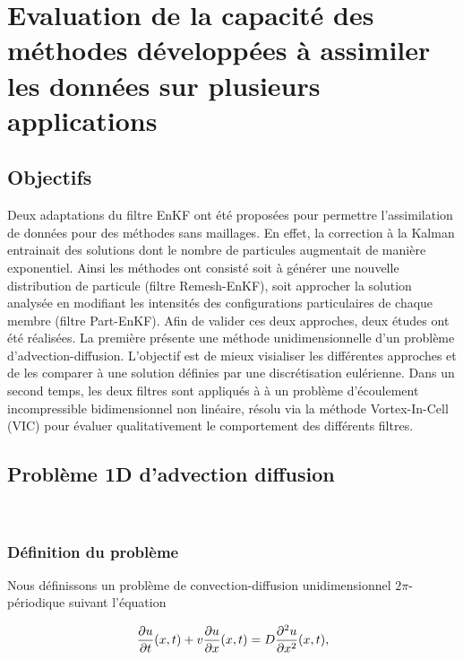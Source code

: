 \chapter{Evaluation de la capacité des méthodes développées à assimiler les données sur plusieurs applications}
\newcommand{\xx}{x_0 = 0.02}
\newcommand{\sigx}{\sigma_0^2 = 0.5}
\newcommand{\npart}{$N_{part} = 100$}
\newcommand{\ngrid}{$N_{grid} = 100$}
\newcommand{\sigmaY}{0.05}

\section{Objectifs}

Deux adaptations du filtre EnKF ont été proposées pour permettre l'assimilation de données pour des méthodes sans maillages. En effet, la correction à la Kalman entrainait des solutions dont le nombre de particules augmentait de manière exponentiel. Ainsi les méthodes ont consisté soit à générer une nouvelle distribution de particule (filtre Remesh-EnKF), soit approcher la solution analysée en modifiant les intensités des configurations particulaires de chaque membre (filtre Part-EnKF). Afin de valider ces deux approches, deux études ont été réalisées. La première présente une méthode unidimensionnelle d'un problème d'advection-diffusion. L'objectif est de mieux visialiser les différentes approches et de les comparer à une solution définies par une discrétisation eulérienne. Dans un second temps, les deux filtres sont appliqués à à un problème d'écoulement incompressible bidimensionnel non linéaire, résolu via la méthode Vortex-In-Cell (VIC) pour évaluer qualitativement le comportement des différents filtres.

\section{Problème 1D d'advection diffusion}~\label{sec:App_1D}

\subsection{Définition du problème}
Nous définissons un problème de convection-diffusion unidimensionnel $2\pi$-périodique suivant l'équation

\begin{equation*}
    \frac{\partial u}{\partial t}(x,t) + v \frac{\partial u}{\partial x}(x,t) = D \frac{\partial^2 u}{\partial x^2}(x,t),
\end{equation*}


